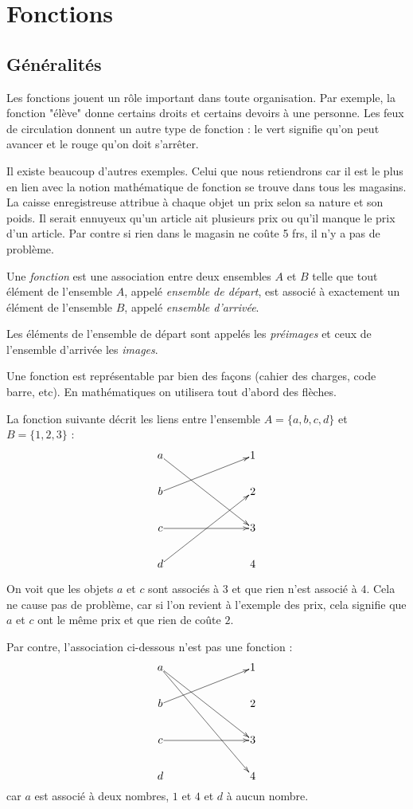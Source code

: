 \chapter{Fonctions}

\section{Généralités}

Les fonctions jouent un rôle important dans toute organisation. Par exemple, la fonction "élève" donne certains droits et certains devoirs à une personne. 
Les feux de circulation donnent un autre type de fonction : le vert signifie qu'on peut avancer et le rouge qu'on doit s'arrêter.

Il existe beaucoup d'autres exemples. Celui que nous retiendrons car il est le plus en lien avec la notion mathématique de fonction se trouve dans tous les magasins. La caisse enregistreuse attribue à chaque objet un prix selon sa nature et son poids. Il serait ennuyeux qu'un article ait plusieurs prix ou qu'il manque le prix d'un article. Par contre si rien dans le magasin ne coûte 5 frs, il n'y a pas de problème.

\begin{definition}
Une \emph{fonction} est une association entre deux ensembles $A$ et $B$ telle que tout élément de l'ensemble $A$, appelé \emph{ensemble de départ}, est associé à exactement un élément de l'ensemble $B$, appelé \emph{ensemble d'arrivée}.

Les éléments de l'ensemble de départ sont appelés les \emph{préimages} et ceux de l'ensemble d'arrivée les \emph{images}.
\end{definition}

Une fonction est représentable par bien des façons (cahier des charges, code barre, etc). En mathématiques on utilisera tout d'abord des flèches.

\begin{exemple}
La fonction suivante décrit les liens entre l'ensemble $A=\{ a,b,c,d\}$ et ${B=\{ 1,2,3\}}$ :
$$
\xymatrix@1{
a \ar[rrrdd] &&& 1 \\
b \ar[rrru] &&& 2 \\
c \ar[rrr] &&& 3 \\
d \ar[rrruu] &&& 4
}
$$
  
On voit que les objets $a$ et $c$ sont associés à $3$ et que rien n'est associé à $4$. Cela ne cause pas de problème, car si l'on revient à l'exemple des prix, cela signifie que $a$ et $c$ ont le même prix et que rien de coûte $2$.

Par contre, l'association ci-dessous n'est pas une fonction :
$$
\xymatrix@1{
a \ar[rrrdd] \ar[rrrddd] &&& 1 \\
b \ar[rrru] &&& 2 \\
c \ar[rrr] &&& 3 \\
d &&& 4
}
$$
car $a$ est associé à deux nombres, $1$ et $4$ et $d$ à aucun nombre.
\end{exemple}

